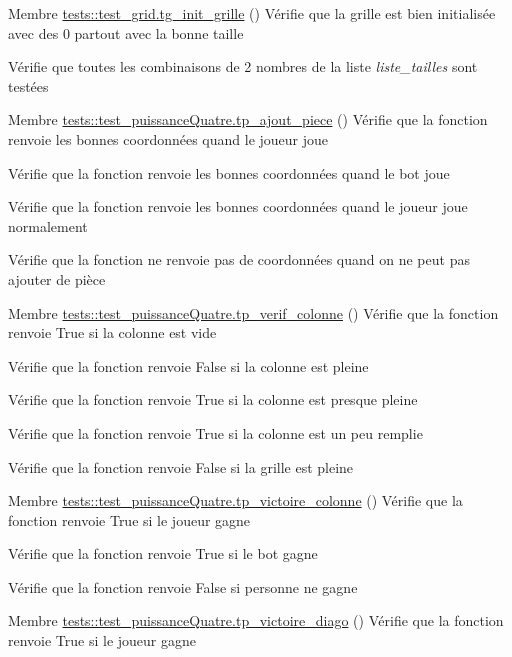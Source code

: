 
\begin{DoxyRefList}
\item[Membre \mbox{\hyperlink{namespacetests_1_1test__grid_abd1e217c51c4ec2bb4d911605484016c}{tests\+::test\+\_\+grid.tg\+\_\+init\+\_\+grille}} ()]\label{test__test000001}%
%
Vérifie que la grille est bien initialisée avec des 0 partout avec la bonne taille 

Vérifie que toutes les combinaisons de 2 nombres de la liste {\itshape liste\+\_\+tailles} sont testées 
\item[Membre \mbox{\hyperlink{namespacetests_1_1test__puissanceQuatre_a50ee15df29277e36dd8c7b091e6e6839}{tests\+::test\+\_\+puissance\+Quatre.tp\+\_\+ajout\+\_\+piece}} ()]\label{test__test000003}%
%
Vérifie que la fonction renvoie les bonnes coordonnées quand le joueur joue 

Vérifie que la fonction renvoie les bonnes coordonnées quand le bot joue 

Vérifie que la fonction renvoie les bonnes coordonnées quand le joueur joue normalement 

Vérifie que la fonction ne renvoie pas de coordonnées quand on ne peut pas ajouter de pièce 
\item[Membre \mbox{\hyperlink{namespacetests_1_1test__puissanceQuatre_a3d1cea88a0c0ecf7a46333b4d98a0065}{tests\+::test\+\_\+puissance\+Quatre.tp\+\_\+verif\+\_\+colonne}} ()]\label{test__test000002}%
%
Vérifie que la fonction renvoie True si la colonne est vide 

Vérifie que la fonction renvoie False si la colonne est pleine 

Vérifie que la fonction renvoie True si la colonne est presque pleine 

Vérifie que la fonction renvoie True si la colonne est un peu remplie 

Vérifie que la fonction renvoie False si la grille est pleine 
\item[Membre \mbox{\hyperlink{namespacetests_1_1test__puissanceQuatre_a6b60c67d64944868f7f29f4ecd75dff0}{tests\+::test\+\_\+puissance\+Quatre.tp\+\_\+victoire\+\_\+colonne}} ()]\label{test__test000005}%
%
Vérifie que la fonction renvoie True si le joueur gagne 

Vérifie que la fonction renvoie True si le bot gagne 

Vérifie que la fonction renvoie False si personne ne gagne 
\item[Membre \mbox{\hyperlink{namespacetests_1_1test__puissanceQuatre_afca80042370ade9eff4620f6f8ffd306}{tests\+::test\+\_\+puissance\+Quatre.tp\+\_\+victoire\+\_\+diago}} ()]\label{test__test000006}%
%
Vérifie que la fonction renvoie True si le joueur gagne 


\end{DoxyRefList}
